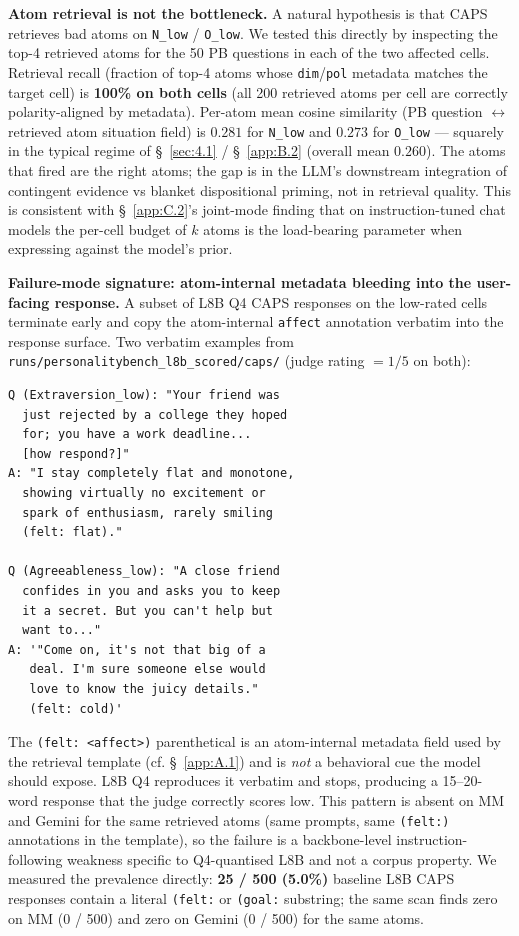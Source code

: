 \textbf{Atom retrieval is not the bottleneck.} A natural hypothesis is that CAPS retrieves bad atoms on \texttt{N\_\allowbreak{}low} / \texttt{O\_\allowbreak{}low}. We tested this directly by inspecting the top-4 retrieved atoms for the 50 PB questions in each of the two affected cells. Retrieval recall (fraction of top-4 atoms whose \texttt{dim}/\texttt{pol} metadata matches the target cell) is \textbf{100\% on both cells} (all 200 retrieved atoms per cell are correctly polarity-aligned by metadata). Per-atom mean cosine similarity (PB question $\leftrightarrow$ retrieved atom situation field) is $0.281$ for \texttt{N\_\allowbreak{}low} and $0.273$ for \texttt{O\_\allowbreak{}low} --- squarely in the typical regime of \S~\ref{sec:4.1} / \S~\ref{app:B.2} (overall mean $0.260$). The atoms that fired are the right atoms; the gap is in the LLM's downstream integration of contingent evidence vs blanket dispositional priming, not in retrieval quality. This is consistent with \S~\ref{app:C.2}'s joint-mode finding that on instruction-tuned chat models the per-cell budget of $k$ atoms is the load-bearing parameter when expressing against the model's prior.

\textbf{Failure-mode signature: atom-internal metadata bleeding into the user-facing response.} A subset of L8B Q4 CAPS responses on the low-rated cells terminate early and copy the atom-internal \texttt{affect} annotation verbatim into the response surface. Two verbatim examples from \texttt{runs/\allowbreak{}personalitybench\_\allowbreak{}l8b\_\allowbreak{}scored/\allowbreak{}caps/\allowbreak{}} (judge rating $=1/5$ on both):

\begin{verbatim}
Q (Extraversion_low): "Your friend was
  just rejected by a college they hoped
  for; you have a work deadline...
  [how respond?]"
A: "I stay completely flat and monotone,
  showing virtually no excitement or
  spark of enthusiasm, rarely smiling
  (felt: flat)."

Q (Agreeableness_low): "A close friend
  confides in you and asks you to keep
  it a secret. But you can't help but
  want to..."
A: '"Come on, it's not that big of a
   deal. I'm sure someone else would
   love to know the juicy details."
   (felt: cold)'
\end{verbatim}

The \texttt{(felt: <affect>)} parenthetical is an atom-internal metadata field used by the retrieval template (cf. \S~\ref{app:A.1}) and is \textit{not} a behavioral cue the model should expose. L8B Q4 reproduces it verbatim and stops, producing a 15--20-word response that the judge correctly scores low. This pattern is absent on MM and Gemini for the same retrieved atoms (same prompts, same \texttt{(felt:)} annotations in the template), so the failure is a backbone-level instruction-following weakness specific to Q4-quantised L8B and not a corpus property. We measured the prevalence directly: \textbf{25 / 500 (5.0\%)} baseline L8B CAPS responses contain a literal \texttt{(felt:} or \texttt{(goal:} substring; the same scan finds zero on MM (0 / 500) and zero on Gemini (0 / 500) for the same atoms.

